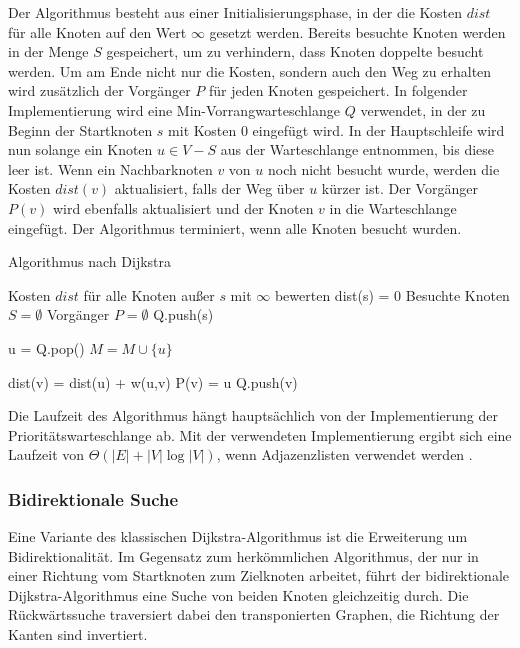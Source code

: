 Der Algorithmus besteht aus einer Initialisierungsphase, in der die Kosten $dist$ für alle Knoten
auf den Wert $\infty$ gesetzt werden. Bereits besuchte Knoten werden in der Menge $S$ gespeichert,
um zu verhindern, dass Knoten doppelte besucht werden. Um am Ende nicht nur die Kosten, sondern auch
den Weg zu erhalten wird zusätzlich der Vorgänger $P$ für jeden Knoten gespeichert. In folgender
Implementierung wird eine Min-Vorrangwarteschlange $Q$ verwendet, in der zu Beginn der Startknoten
$s$ mit Kosten 0 eingefügt wird. In der Hauptschleife wird nun solange ein Knoten $u \in V - S$ aus
der Warteschlange entnommen, bis diese leer ist. Wenn ein Nachbarknoten $v$ von $u$ noch nicht
besucht wurde, werden die Kosten $dist(v)$ aktualisiert, falls der Weg über $u$ kürzer ist. Der
Vorgänger $P(v)$ wird ebenfalls aktualisiert und der Knoten $v$ in die Warteschlange eingefügt. Der
Algorithmus  terminiert, wenn alle Knoten besucht wurden.
\begin{algorithm}[H]
    \caption{Algorithmus nach Dijkstra}
    \label{algo:dijkstra}
    \begin{algorithmic}
        \State Kosten $dist$ für alle Knoten außer $s$ mit $\infty$ bewerten
        \State dist(s) = 0
        \State Besuchte Knoten $S = \emptyset$
        \State Vorgänger $P = \emptyset$
        \State Q.push(s)

        \State u = Q.pop()
        \State $M = M \cup \{u\}$

        \State dist(v) = dist(u) + w(u,v)
        \State P(v) = u
        \State Q.push(v)
        \EndIf
        \EndFor
        \EndWhile
        \EndFunction
    \end{algorithmic}
\end{algorithm}
Die Laufzeit des Algorithmus hängt hauptsächlich von der Implementierung der Prioritätswarteschlange
ab. Mit der verwendeten Implementierung ergibt sich eine Laufzeit von $\Theta(|E| + |V| \log |V|)$,
wenn Adjazenzlisten verwendet werden \cite{intro.algo}.


\subsubsection{Bidirektionale Suche}
Eine Variante des klassischen Dijkstra-Algorithmus ist die Erweiterung um Bidirektionalität.
Im Gegensatz zum herkömmlichen Algorithmus, der nur in einer Richtung vom Startknoten zum Zielknoten
arbeitet, führt der bidirektionale Dijkstra-Algorithmus eine Suche von beiden Knoten gleichzeitig
durch. Die Rückwärtssuche traversiert dabei den transponierten Graphen, \dH die Richtung der Kanten
sind invertiert.

